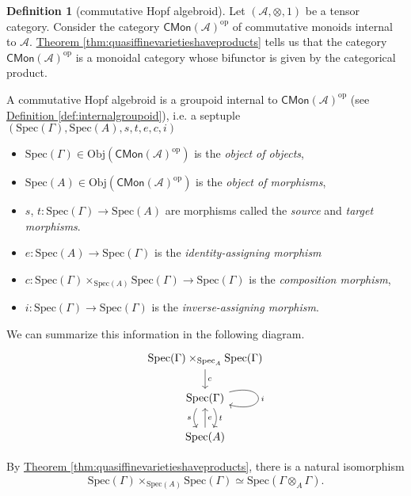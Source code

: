 \documentclass[a4paper,10pt]{scrreprt}
\newcommand{\Obj}{\mathrm{Obj}}
\newcommand{\Spec}{\mathrm{Spec}}
\theoremstyle{definition}
\newtheorem{definition}{Definition}[section]
\theoremstyle{plain}
\theoremstyle{remark}
\begin{document}
\begin{definition}[commutative Hopf algebroid]
  \label{def:commutativehopfalgebroid}
  Let $(\mathscr{A}, \otimes, 1)$ be a tensor category. Consider the category $\mathsf{CMon}(\mathscr{A})^{\mathrm{op}}$ of commutative monoids internal to $\mathscr{A}$. \hyperref[thm:quasiffinevarietieshaveproducts]{Theorem \ref*{thm:quasiffinevarietieshaveproducts}} tells us that the category $\mathsf{CMon}(\mathscr{A})^{\mathrm{op}}$ is a monoidal category whose bifunctor is given by the categorical product.

  A commutative Hopf algebroid is a groupoid internal to $\mathsf{CMon}(\mathscr{A})^{\mathrm{op}}$ (see \hyperref[def:internalgroupoid]{Definition \ref*{def:internalgroupoid}}), i.e. a septuple $(\Spec(\Gamma), \Spec(A), s, t, e, c, i)$
  \begin{itemize}
    \item $\Spec(\Gamma) \in \Obj(\mathsf{CMon}(\mathscr{A})^{\mathrm{op}})$ is the \emph{object of objects}, 
    \item $\Spec(A) \in \Obj(\mathsf{CMon}(\mathscr{A})^{\mathrm{op}})$ is the \emph{object of morphisms},
    \item $s$, $t\colon \Spec(\Gamma) \to \Spec(A)$ are morphisms called the \emph{source} and \emph{target morphisms}.
    \item $e\colon \Spec(A) \to \Spec(\Gamma)$ is the \emph{identity-assigning morphism}
    \item $c\colon \Spec(\Gamma) \times_{\Spec(A)} \Spec(\Gamma) \to \Spec(\Gamma)$ is the \emph{composition morphism},
    \item $i\colon \Spec(\Gamma) \to \Spec(\Gamma)$ is the \emph{inverse-assigning morphism}.
  \end{itemize}

  We can summarize this information in the following diagram.
  \begin{equation*}
    \begin{tikzcd}
      \Spec(\Gamma) \times_{\Spec_{A}} \Spec(\Gamma)
      \arrow[d, "c"]
      \\
      \Spec(\Gamma)
      \arrow[d, shift left, bend left, "t"]
      \arrow[d, shift right, bend right, swap, "s"]
      \arrow[loop right, "i"]
      \\
      \Spec(A)
      \arrow[u, swap, "e"]
    \end{tikzcd}
  \end{equation*}

  By \hyperref[thm:quasiffinevarietieshaveproducts]{Theorem \ref*{thm:quasiffinevarietieshaveproducts}}, there is a natural isomorphism
  \begin{equation*}
    \Spec(\Gamma) \times_{\Spec(A)} \Spec(\Gamma) \simeq \Spec(\Gamma \otimes_{A} \Gamma).
  \end{equation*}


\end{definition}
\end{document}
